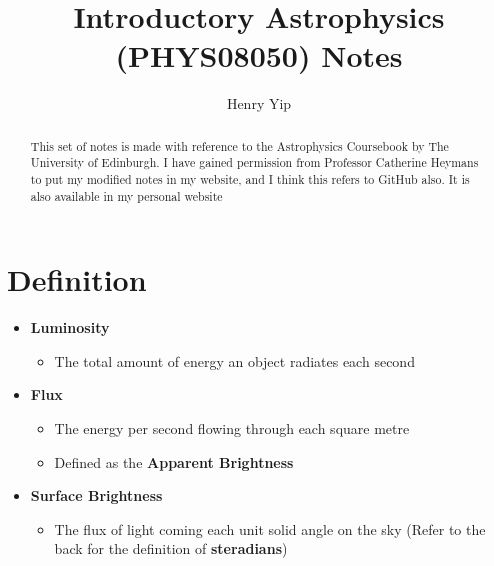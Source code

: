 \documentclass{article}
\title{Introductory Astrophysics (PHYS08050) Notes}
\author{Henry Yip}
\begin{document}
\maketitle
\begin{abstract}
This set of notes is made with reference to the Astrophysics Coursebook by The University of Edinburgh. I have gained permission from Professor Catherine Heymans to put my modified notes in my website, and I think this refers to GitHub also. It is also available in my personal website
\end{abstract}
\section{Definition}
\begin{itemize}
\item \textbf{Luminosity}
\begin{itemize}
\item The total amount of energy an object radiates each second
\end{itemize}
\item \textbf{Flux}
\begin{itemize}
\item The energy per second flowing through each square metre
\item Defined as the \textbf{Apparent Brightness}
\end{itemize}
\item \textbf{Surface Brightness }
\begin{itemize}
\item The flux of light coming each unit solid angle on the sky (Refer to the back for the definition of \textbf{steradians})
\end{itemize}
\end{itemize}
\end{document}
